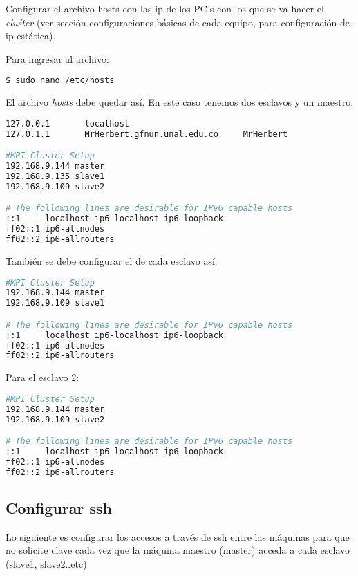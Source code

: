 Configurar el archivo hosts con las ip de los PC's con los que se va hacer el \emph{cluśter} (ver sección configuraciones básicas de cada equipo, para configuración de ip estática). 

Para ingresar al archivo:

\begin{lstlisting}[language=bash,style=mystyle2]
$ sudo nano /etc/hosts
\end{lstlisting} 

El archivo \emph{hosts} debe quedar así. En este caso tenemos dos esclavos y un maestro.

\begin{lstlisting}[language=bash,caption={Archivo hosts en el maestro},style=mystyle2]
127.0.0.1       localhost
127.0.1.1       MrHerbert.gfnun.unal.edu.co     MrHerbert

#MPI Cluster Setup
192.168.9.144 master
192.168.9.135 slave1
192.168.9.109 slave2

# The following lines are desirable for IPv6 capable hosts
::1     localhost ip6-localhost ip6-loopback
ff02::1 ip6-allnodes
ff02::2 ip6-allrouters

\end{lstlisting} 


También se debe configurar el de cada esclavo así:

\begin{lstlisting}[language=bash,caption={Archivo hosts esclavo 1},style=mystyle2]
#MPI Cluster Setup
192.168.9.144 master
192.168.9.109 slave1

# The following lines are desirable for IPv6 capable hosts
::1     localhost ip6-localhost ip6-loopback
ff02::1 ip6-allnodes
ff02::2 ip6-allrouters

\end{lstlisting} 

Para el esclavo 2:

\begin{lstlisting}[language=bash,caption={Archivo esclavo 1},style=mystyle2]
#MPI Cluster Setup
192.168.9.144 master
192.168.9.109 slave2

# The following lines are desirable for IPv6 capable hosts
::1     localhost ip6-localhost ip6-loopback
ff02::1 ip6-allnodes
ff02::2 ip6-allrouters

\end{lstlisting} 



\subsection{Configurar ssh}
Lo siguiente es configurar los accesos a través de ssh entre las máquinas para que no
solicite clave cada vez que la máquina maestro (master) acceda a cada esclavo (slave1, slave2..etc)

